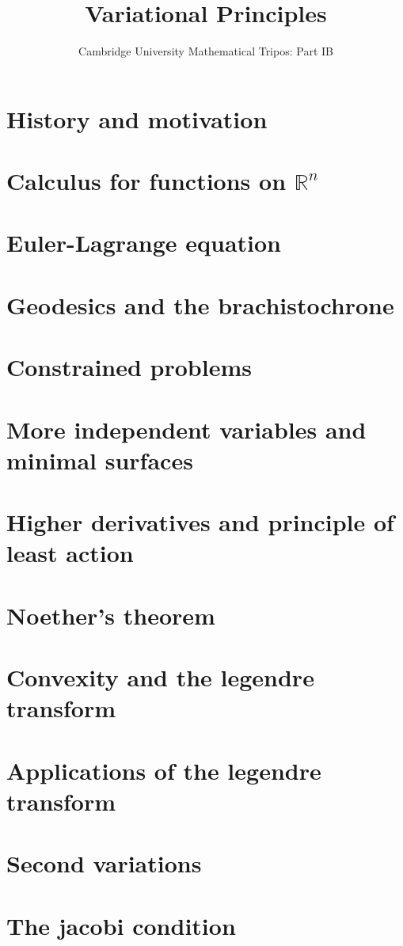 \documentclass{article}
\title{Variational Principles}
\author{Cambridge University Mathematical Tripos: Part IB}
\begin{document}
\maketitle

\tableofcontentsnewpage{}

\section{History and motivation}

\section{Calculus for functions on \(\mathbb R^n\)}

\section{Euler-Lagrange equation}

\section{Geodesics and the brachistochrone}

\section{Constrained problems}

\section{More independent variables and minimal surfaces}

\section{Higher derivatives and principle of least action}

\section{Noether's theorem}

\section{Convexity and the legendre transform}

\section{Applications of the legendre transform}

\section{Second variations}

\section{The jacobi condition}

\end{document}
